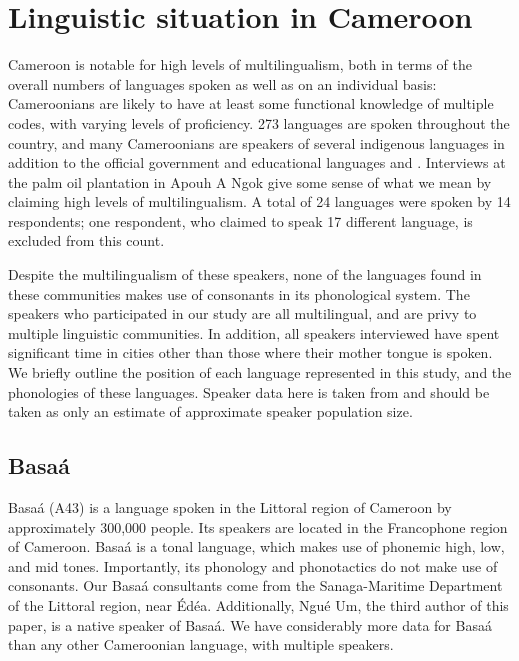 \documentclass[output=paper
,newtxmath
,modfonts
,nonflat]{langsci/langscibook}
\begin{document}
\section{Linguistic situation in Cameroon}

Cameroon is notable for high levels of multilingualism, both in terms of the overall numbers of languages spoken as well as on an individual basis:  Cameroonians are likely to have at least some functional knowledge of multiple codes, with varying levels of proficiency. 273 languages are spoken throughout the country, and many Cameroonians are speakers of several indigenous languages in addition to the official government and educational languages  and . Interviews at the palm oil plantation in Apouh A Ngok give some sense of what we mean by claiming high levels of multilingualism. A total of 24 languages were spoken by 14 respondents; one respondent, who claimed to speak 17 different language, is excluded from this count. 

Despite the multilingualism of these speakers, none of the languages found in these communities makes use of  consonants in its phonological system. The speakers who participated in our study  are all multilingual, and are privy to multiple linguistic communities. In addition, all speakers interviewed have spent significant time in cities other than those where their mother tongue is spoken. We  briefly outline the position of each language represented in this study, and the phonologies of these languages. Speaker data here is taken from \citet{lewisetal2016} and should be taken as only an estimate of approximate speaker population size. 

\subsection{Basa\'a}

Basa\'a (A43) is a language spoken in the Littoral region of Cameroon by approximately 300,000 people. Its speakers are located in the Francophone region of Cameroon. Basa\'a is a tonal language, which makes use of phonemic high, low, and mid tones. Importantly, its phonology and phonotactics do not make use of  consonants. Our Basa\'a consultants come from the Sanaga-Maritime Department of the Littoral region, near \'Ed\'ea. Additionally, Ngu\'{e} Um, the third author of this paper, is a native speaker of Basa\'a. We have considerably more data for Basa\'{a} than any other Cameroonian language, with multiple speakers. 
\end{document}
